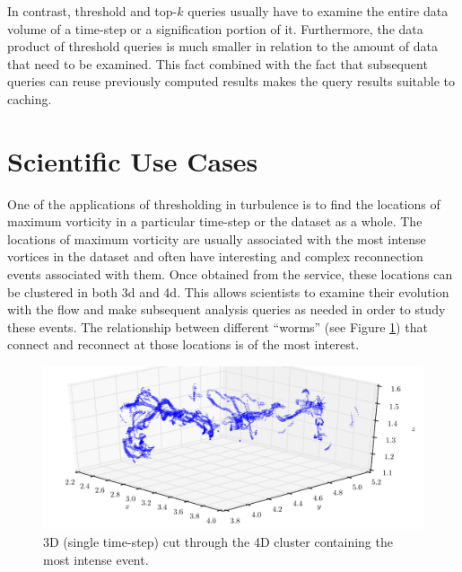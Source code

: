 \documentclass{sig-alternate}
\begin{document}
In contrast, threshold and top-$k$ queries usually have to examine the entire 
data volume of a time-step or a signification portion of it. Furthermore, the data product of threshold queries is much smaller in relation to the amount of 
data that need to be examined. This fact combined with the fact that subsequent queries can reuse 
previously computed results makes the query results suitable to caching. 

\section{Scientific Use Cases}\label{science_use_cases}

One of the applications of thresholding in turbulence is to find the locations of maximum vorticity in a particular time-step or the dataset as a whole.
The locations of maximum vorticity are usually associated with the most intense vortices in the dataset and often have interesting and complex
reconnection events associated with them. 
Once obtained from the service, these locations can be clustered in both 3d and 4d. This allows scientists to examine their evolution with the flow
and make subsequent analysis queries as needed in order to study these events. The relationship between different ``worms'' (see Figure \ref{fig:max_vort_cluster}) that connect and reconnect
at those locations is of the most interest.

\begin{figure}[t]
\centering
\includegraphics[width=7in]{Figures/most_intense_cluster_alt.pdf}
\caption{3D (single time-step) cut through the 4D cluster containing the most intense event.}
\label{fig:max_vort_cluster}
\end{figure}
\end{document}
